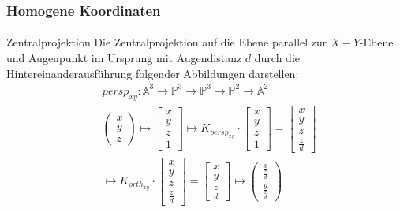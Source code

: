 \documentclass{beamer}
\begin{document}
\begin{frame}
    \frametitle{Homogene Koordinaten}
\framesubtitle{}
\begin{block}{Zentralprojektion}
Die Zentralprojektion auf die Ebene parallel zur $X-Y$-Ebene und Augenpunkt im Ursprung mit Augendistanz $d$ durch die Hintereinanderausführung folgender Abbildungen darstellen:
\begin{align*}
& persp_{xy} :\mathbb{A}^3   \to \mathbb{P}^3    \to  \mathbb{P}^3    \to \mathbb{P}^2    \to \mathbb{A}^2  \\
&\begin{pmatrix} x \\ y \\ z \end{pmatrix} \mapsto \begin{bmatrix} x \\ y \\ z \\ 1 \end{bmatrix}   \mapsto K_{persp_{xy}} \cdot  \begin{bmatrix} x \\ y \\ z \\ 1 \end{bmatrix} =   \begin{bmatrix} x \\ y \\ z \\ \frac{z}{d}  \end{bmatrix} \\
 & \mapsto K_{orth_{xy}} \cdot   \begin{bmatrix} x \\ y \\ z \\ \frac{z}{d}  \end{bmatrix}=   \begin{bmatrix} x \\ y \\ \frac{z}{d} \end{bmatrix}   \mapsto 
 \begin{pmatrix}  \frac{x}{\frac{z}{d} } \\   \frac{y}{\frac{z}{d} } \end{pmatrix}
 \end{align*}

\end{block}
\end{frame}
\end{document}
